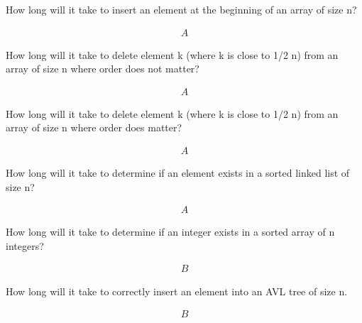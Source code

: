 \documentclass[12pt]{article}
\newenvironment{sol}[1][Solution]{\begin{trivlist}
\item[\hskip\labelsep {\bfseries #1:}]}{\end{trivlist}}
\begin{document}
\begin{enumerate}
    \item How long will it take to insert an element at the beginning of an array of size n?
    \begin{sol}
        \begin{align*}
        A
        \end{align*}
    \end{sol}

    \item How long will it take to delete element k (where k is close to 1/2 n) from an array of size n where order does not matter?
    \begin{sol}
        \begin{align*}
        A
        \end{align*}
    \end{sol}
    
    \item How long will it take to delete element k (where k is close to 1/2 n) from an array of size n where order does matter?
    \begin{sol}
        \begin{align*}
        A
        \end{align*}
    \end{sol}
    
    \item How long will it take to determine if an element exists in a sorted linked list of size n?
    \begin{sol}
        \begin{align*}
        A
        \end{align*}
    \end{sol}
    
    \item How long will it take to determine if an integer exists in a sorted array of n integers?
    \begin{sol}
        \begin{align*}
        B
        \end{align*}
    \end{sol}

    \item How long will it take to correctly insert an element into an AVL tree of size n.
    \begin{sol}
        \begin{align*}
        B
        \end{align*}
    \end{sol}


\end{enumerate}
\end{document}

